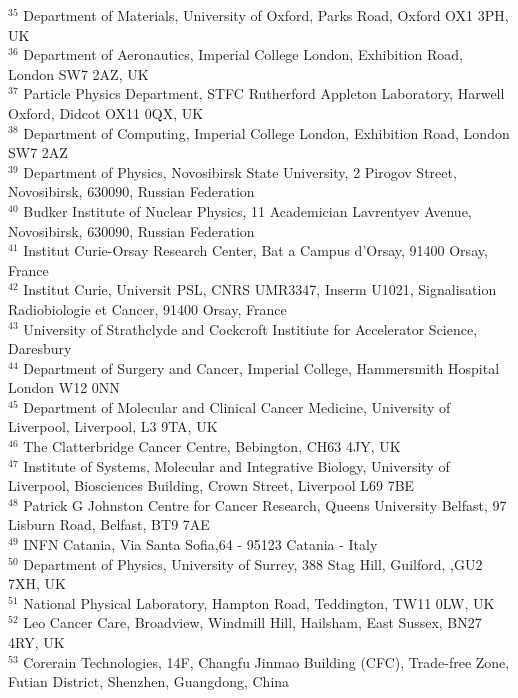 {\begin{tabbing}
     $^{35}$ \> Department of Materials, University of Oxford, Parks Road, Oxford OX1 3PH, UK\\
     $^{36}$ \> Department of Aeronautics, Imperial College London, Exhibition Road, London SW7 2AZ, UK\\
     $^{37}$ \> Particle Physics Department, STFC Rutherford Appleton Laboratory, Harwell Oxford, Didcot OX11 0QX, UK\\
     $^{38}$ \> Department of Computing, Imperial College London, Exhibition Road, London SW7 2AZ\\
     $^{39}$ \> Department of Physics, Novosibirsk State University, 2 Pirogov Street, Novosibirsk, 630090, Russian Federation\\
     $^{40}$ \> Budker Institute of Nuclear Physics, 11 Academician Lavrentyev Avenue, Novosibirsk, 630090, Russian Federation\\
     $^{41}$ \> Institut Curie-Orsay Research Center, Bat a Campus d'Orsay, 91400 Orsay, France\\
     $^{42}$ \> Institut Curie, Universit PSL, CNRS UMR3347, Inserm U1021, Signalisation Radiobiologie et Cancer, 91400 Orsay, France\\
     $^{43}$ \> University of Strathclyde and Cockcroft Institiute for Accelerator Science, Daresbury\\
     $^{44}$ \> Department of Surgery and Cancer, Imperial College, Hammersmith Hospital London W12 0NN\\
     $^{45}$ \> Department of Molecular and Clinical Cancer Medicine, University of Liverpool, Liverpool, L3 9TA, UK\\
     $^{46}$ \> The Clatterbridge Cancer Centre, Bebington, CH63 4JY, UK\\
     $^{47}$ \> Institute of Systems, Molecular and Integrative Biology, University of Liverpool, Biosciences Building, Crown Street, Liverpool L69 7BE\\
     $^{48}$ \> Patrick G Johnston Centre for Cancer Research, Queens University Belfast, 97 Lisburn Road, Belfast, BT9 7AE\\
     $^{49}$ \> INFN Catania, Via Santa Sofia,64 - 95123 Catania - Italy\\
     $^{50}$ \> Department of Physics, University of Surrey, 388 Stag Hill, Guilford, ,GU2 7XH, UK\\
     $^{51}$ \> National Physical Laboratory, Hampton Road, Teddington, TW11 0LW, UK\\
     $^{52}$ \> Leo Cancer Care, Broadview, Windmill Hill, Hailsham, East Sussex, BN27 4RY, UK\\
     $^{53}$ \> Corerain Technologies, 14F, Changfu Jinmao Building (CFC), Trade-free Zone, Futian District, Shenzhen, Guangdong, China\\
    ~   \> \\
  \end{tabbing}
}
